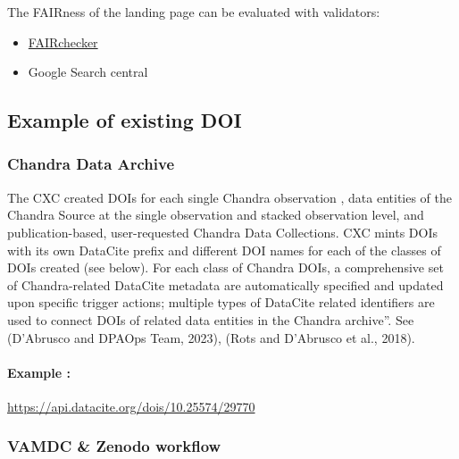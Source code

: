 \documentclass[11pt,a4paper]{ivoa}
\begin{document}
The FAIRness of the landing page can be evaluated with validators:

\begin{itemize}
\item{} \href{https://fair-checker.france-bioinformatique.fr/check}{FAIRchecker}
\item{} Google Search central
\end{itemize}

\subsection{Example of existing DOI}\hypertarget{example-of-existing-doi}{}\label{sec:example-of-existing-doi}


\subsubsection{Chandra Data Archive}\hypertarget{chandra-data-archive}{}\label{sec:chandra-data-archive}

The CXC created DOIs for each single Chandra observation \citep{2023ChNew..34....5D}, data entities of the Chandra Source at the single observation and stacked observation level, and publication-based, user-requested Chandra Data Collections. CXC mints DOIs with its own \mbox{DataCite} prefix and different DOI names for each of the classes of DOIs created (see below). For each class of Chandra DOIs, a comprehensive set of Chandra-related DataCite metadata are automatically specified and updated upon specific trigger actions; multiple types of DataCite related identifiers are used to connect DOIs of related data entities in the Chandra archive''.\newline %
See (D'Abrusco and DPAOps Team, 2023), (Rots and D'Abrusco et al., 2018).

\paragraph{Example :} \url{https://api.datacite.org/dois/10.25574/29770}

\subsubsection{VAMDC \& Zenodo workflow}\hypertarget{vamdc--zenodo-workflow}{}\label{sec:vamdc--zenodo-workflow}
\end{document}

